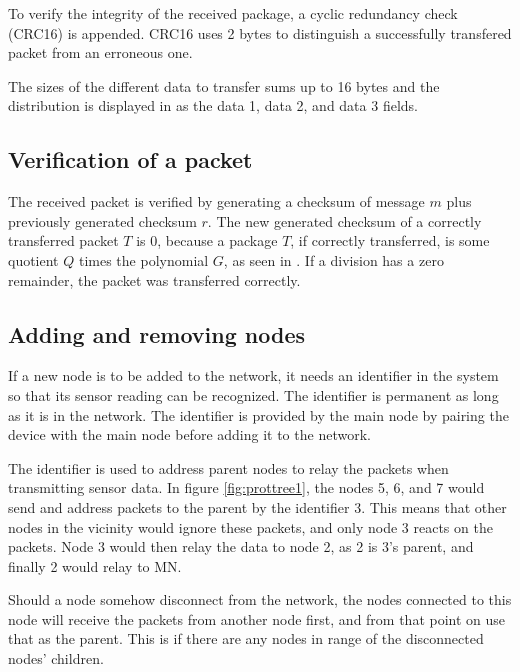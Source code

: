 To verify the integrity of the received package, a cyclic redundancy check (CRC16) is appended. CRC16 uses 2 bytes to distinguish a successfully transfered packet from an erroneous one.

The sizes of the different data to transfer sums up to 16 bytes and the distribution is displayed in  as the data 1, data 2, and data 3 fields.

\subsection{Verification of a packet}
The received packet is verified by generating a checksum of message $m$ plus previously generated checksum $r$.
The new generated checksum of a correctly transferred packet $T$ is 0, because a package $T$, if correctly transferred, is some quotient $Q$ times the polynomial $G$, as seen in . If a division has a zero remainder, the packet was transferred correctly.

\subsection{Adding and removing nodes}
If a new node is to be added to the network, it needs an identifier in the system so that its sensor reading can be recognized. The identifier is permanent as long as it is in the network.
The identifier is provided by the main node by pairing the device with the main node before adding it to the network. 

The identifier is used to address parent nodes to relay the packets when transmitting sensor data. In figure \ref{fig:prottree1}, the nodes 5, 6, and 7 would send and address packets to the parent by the identifier 3. This means that other nodes in the vicinity would ignore these packets, and only node 3 reacts on the packets. Node 3 would then relay the data to node 2, as 2 is 3's parent, and finally 2 would relay to MN.

Should a node somehow disconnect from the network, the nodes connected to this node will receive the packets from another node first, and from that point on use that as the parent. This is if there are any nodes in range of the disconnected nodes' children. 

